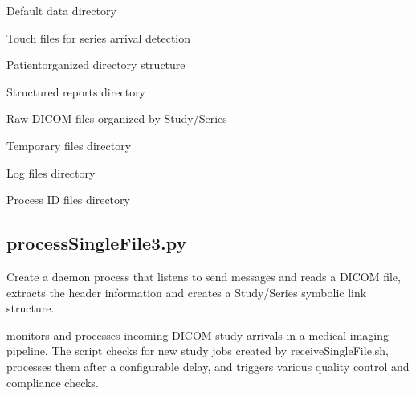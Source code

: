 \documentclass[letterpaper,10pt,english]{sphinxmanual}
\begin{document}
\sphinxAtStartPar
{}

\begin{DUlineblock}{0em}
\item[] \sphinxhyphen{}  \sphinxhyphen{} Default data directory
\item[] \sphinxhyphen{}  \sphinxhyphen{} Touch files for series arrival detection
\item[] \sphinxhyphen{}  \sphinxhyphen{} Patient\sphinxhyphen{}organized directory structure
\item[] \sphinxhyphen{}  \sphinxhyphen{} Structured reports directory
\item[] \sphinxhyphen{}  \sphinxhyphen{} Raw DICOM files organized by Study/Series
\item[] \sphinxhyphen{}  \sphinxhyphen{} Temporary files directory
\item[] \sphinxhyphen{}  \sphinxhyphen{} Log files directory
\item[] \sphinxhyphen{}  \sphinxhyphen{} Process ID files directory
\end{DUlineblock}


\subsection{processSingleFile3.py}
\label{\detokenize{Architecture/scripts/processSingleFile3:processsinglefile3-py}}\label{\detokenize{Architecture/scripts/processSingleFile3::doc}}
\sphinxAtStartPar
Create a daemon process that listens to send messages and reads a DICOM file,
extracts the header information and creates a Study/Series symbolic link structure.
\begin{description}
\sphinxAtStartPar
{}

\end{description}

\sphinxstepscope

\sphinxAtStartPar
{} monitors and processes incoming DICOM study arrivals in a medical imaging pipeline. The script checks for new study jobs created by receiveSingleFile.sh, processes them after a configurable delay, and triggers various quality control and compliance checks.
\end{document}
